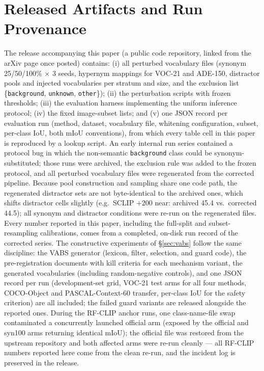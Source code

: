 \documentclass[11pt]{article}
\newcommand{\miou}{mIoU}
\begin{document}
\section{Released Artifacts and Run Provenance}
\label{app:artifacts}

The release accompanying this paper (a public code repository, linked from the arXiv
page once posted) contains: (i) all perturbed vocabulary files
(synonym 25/50/100\% $\times$ 3 seeds, hypernym mappings for VOC-21 and ADE-150,
distractor pools and injected vocabularies per stratum and size, and the exclusion
list \{\texttt{background}, \texttt{unknown}, \texttt{other}\}); (ii) the perturbation
scripts with frozen thresholds; (iii) the evaluation harness implementing the uniform
inference protocol; (iv) the fixed image-subset lists; and (v) one JSON record per
evaluation run (method, dataset, vocabulary file, whitening configuration, subset,
per-class IoU, both \miou{} conventions), from which every table cell in this paper is
reproduced by a lookup script. An early internal run series contained a protocol bug
in which the non-semantic \texttt{background} class could be synonym-substituted;
those runs were archived, the exclusion rule was added to the frozen protocol, and all
perturbed vocabulary files were regenerated from the corrected pipeline. Because pool
construction and sampling share one code path, the regenerated distractor sets are not
byte-identical to the archived ones, which shifts distractor cells slightly (e.g.\
SCLIP $+200$ near: archived 45.4 vs.\ corrected 44.5); all synonym and distractor
conditions were re-run on the regenerated files. Every number reported in this paper,
including the full-split and subset-resampling calibrations, comes from a completed,
on-disk run record of the corrected series. The constructive experiments of
\S\ref{sec:vabs} follow the same discipline: the VABS generator (lexicon, filter,
selection, and guard code), the pre-registration documents with kill criteria for
each mechanism variant, the generated vocabularies (including random-negative
controls), and one JSON record per run
(development-set grid, VOC-21 test arms for all four methods, COCO-Object and
PASCAL-Context-60 transfer, per-class IoU for the safety criterion) are all included;
the failed guard variants are released alongside the reported ones.
During the RF-CLIP anchor runs, one class-name-file swap contaminated a
concurrently launched official arm (exposed by the official and syn100 arms
returning identical \miou); the official file was restored from the
upstream repository and both affected arms were re-run cleanly --- all
RF-CLIP numbers reported here come from the clean re-run, and the incident
log is preserved in the release.
\end{document}
